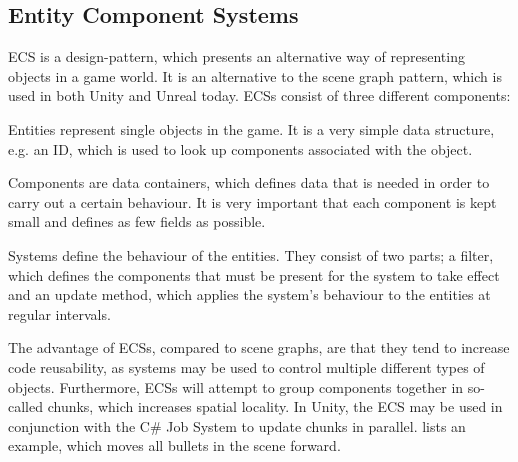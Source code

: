 \subsection{Entity Component Systems}
\gls{ECS} is a design-pattern, which presents an alternative way of representing objects in a game world. It is an alternative to the scene graph pattern\cite{scene:graph}, which is used in both Unity and Unreal today. \glspl{ECS} consist of three different components\cite{unity:ecs,ecs:general}:
\begin{labeling}{\quad\quad}
    \item[Entities] represent single objects in the game. It is a very simple data structure, e.g. an ID, which is used to look up components associated with the object.
    \item[Components] are data containers, which defines data that is needed in order to carry out a certain behaviour. It is very important that each component is kept small and defines as few fields as possible.
    \item[Systems] define the behaviour of the entities. They consist of two parts; a filter, which defines the components that must be present for the system to take effect and an update method, which applies the system's behaviour to the entities at regular intervals.
\end{labeling}

The advantage of \glspl{ECS}, compared to scene graphs, are that they tend to increase code reusability, as systems may be used to control multiple different types of objects. Furthermore, \glspl{ECS} will attempt to group components together in so-called chunks, which increases spatial locality. In Unity, the \gls{ECS} may be used in conjunction with the C\# Job System to update chunks in parallel\cite{unity:ecs}.  lists an example, which moves all bullets in the scene forward.

